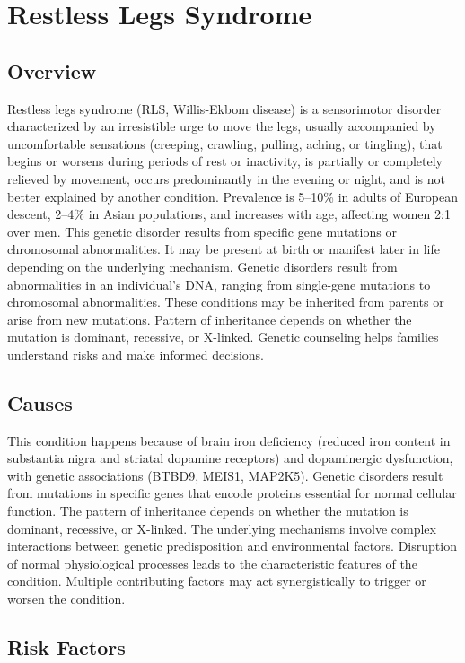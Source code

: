 \chapter{Restless Legs Syndrome}
\label{sec:Restless Legs Syndrome}

\section{Overview}
Restless legs syndrome (RLS, Willis-Ekbom disease) is a sensorimotor disorder characterized by an irresistible urge to move the legs, usually accompanied by uncomfortable sensations (creeping, crawling, pulling, aching, or tingling), that begins or worsens during periods of rest or inactivity, is partially or completely relieved by movement, occurs predominantly in the evening or night, and is not better explained by another condition. Prevalence is 5--10\% in adults of European descent, 2--4\% in Asian populations, and increases with age, affecting women 2:1 over men. This genetic disorder results from specific gene mutations or chromosomal abnormalities. It may be present at birth or manifest later in life depending on the underlying mechanism. Genetic disorders result from abnormalities in an individual's DNA, ranging from single-gene mutations to chromosomal abnormalities. These conditions may be inherited from parents or arise from new mutations. Pattern of inheritance depends on whether the mutation is dominant, recessive, or X-linked. Genetic counseling helps families understand risks and make informed decisions.
\section{Causes}
This condition happens because of brain iron deficiency (reduced iron content in substantia nigra and striatal dopamine receptors) and dopaminergic dysfunction, with genetic associations (BTBD9, MEIS1, MAP2K5). Genetic disorders result from mutations in specific genes that encode proteins essential for normal cellular function. The pattern of inheritance depends on whether the mutation is dominant, recessive, or X-linked. The underlying mechanisms involve complex interactions between genetic predisposition and environmental factors. Disruption of normal physiological processes leads to the characteristic features of the condition. Multiple contributing factors may act synergistically to trigger or worsen the condition.
\section{Risk Factors}


